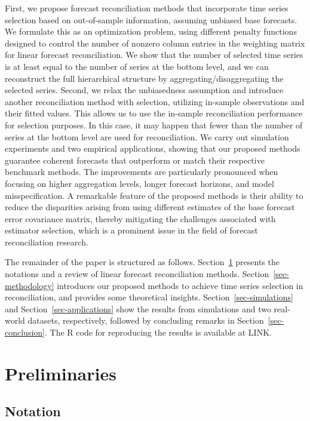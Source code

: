 \documentclass[
  12pt,
  11pt]{article}
\begin{document}
First, we propose forecast reconciliation methods that incorporate time
series selection based on out-of-sample information, assuming unbiased
base forecasts. We formulate this as an optimization problem, using
different penalty functions designed to control the number of nonzero
column entries in the weighting matrix for linear forecast
reconciliation. We show that the number of selected time series is at
least equal to the number of series at the bottom level, and we can
reconstruct the full hierarchical structure by
aggregating/disaggregating the selected series. Second, we relax the
unbiasedness assumption and introduce another reconciliation method with
selection, utilizing in-sample observations and their fitted values.
This allows us to use the in-sample reconciliation performance for
selection purposes. In this case, it may happen that fewer than the
number of series at the bottom level are used for reconciliation. We
carry out simulation experiments and two empirical applications, showing
that our proposed methods guarantee coherent forecasts that outperform
or match their respective benchmark methods. The improvements are
particularly pronounced when focusing on higher aggregation levels,
longer forecast horizons, and model misspecification. A remarkable
feature of the proposed methods is their ability to reduce the
disparities arising from using different estimates of the base forecast
error covariance matrix, thereby mitigating the challenges associated
with estimator selection, which is a prominent issue in the field of
forecast reconciliation research.

The remainder of the paper is structured as follows.
Section~\ref{sec-preliminaries} presents the notations and a review of
linear forecast reconciliation methods. Section~\ref{sec-methodology}
introduces our proposed methods to achieve time series selection in
reconciliation, and provides some theoretical insights.
Section~\ref{sec-simulations} and Section~\ref{sec-applications} show
the results from simulations and two real-world datasets, respectively,
followed by concluding remarks in Section~\ref{sec-conclusion}. The R
code for reproducing the results is available at LINK.

\hypertarget{sec-preliminaries}{%
\section{Preliminaries}\label{sec-preliminaries}}

\hypertarget{notation}{%
\subsection{Notation}\label{notation}}
\end{document}
